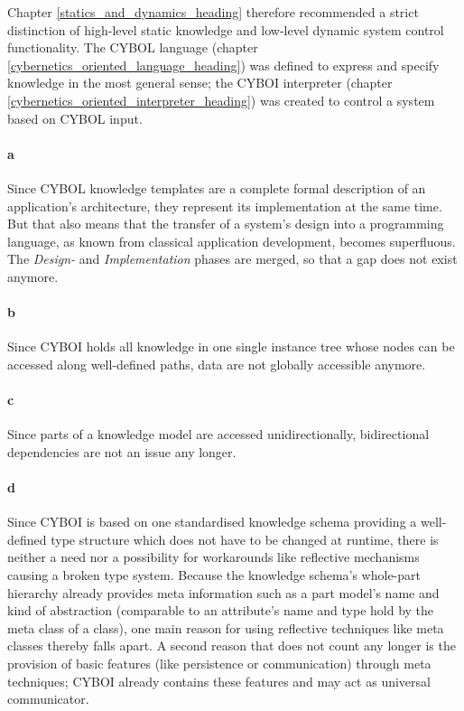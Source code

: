 Chapter \ref{statics_and_dynamics_heading} therefore recommended a strict distinction
of high-level static knowledge and low-level dynamic system control functionality.
The CYBOL language (chapter \ref{cybernetics_oriented_language_heading}) was
defined to express and specify knowledge in the most general sense; the CYBOI
interpreter (chapter \ref{cybernetics_oriented_interpreter_heading}) was
created to control a system based on CYBOL input.

\paragraph{a}

Since CYBOL knowledge templates are a complete formal description of an
application's architecture, they represent its implementation at the same time.
But that also means that the transfer of a system's design into a programming
language, as known from classical application development, becomes superfluous.
The \emph{Design-} and \emph{Implementation} phases are merged, so that a gap
does not exist anymore.

\paragraph{b}

Since CYBOI holds all knowledge in one single instance tree whose nodes can
be accessed along well-defined paths, data are not globally accessible anymore.

\paragraph{c}

Since parts of a knowledge model are accessed unidirectionally, bidirectional
dependencies are not an issue any longer.

\paragraph{d}

Since CYBOI is based on one standardised knowledge schema providing a
well-defined type structure which does not have to be changed at runtime, there
is neither a need nor a possibility for workarounds like reflective mechanisms
causing a broken type system. Because the knowledge schema's whole-part
hierarchy already provides meta information such as a part model's name and
kind of abstraction (comparable to an attribute's name and type hold by the
meta class of a class), one main reason for using reflective techniques like
meta classes thereby falls apart. A second reason that does not count any
longer is the provision of basic features (like persistence or communication)
through meta techniques; CYBOI already contains these features and may act as
universal communicator.

